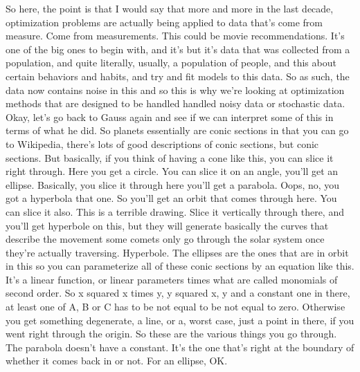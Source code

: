 \documentclass[11pt,a4paper]{article}
\begin{document}
So here, the point is that I would say that more and more in the last decade, optimization problems are actually being applied to data that's come from measure. Come from measurements. This could be movie recommendations. It's one of the big ones to begin with, and it's but it's data that was collected from a population, and quite literally, usually, a population of people, and this about certain behaviors and habits, and try and fit models to this data. So as such, the data now contains noise in this and so this is why we're looking at optimization methods that are designed to be handled handled noisy data or stochastic data. Okay, let's go back to Gauss again and see if we can interpret some of this in terms of what he did. So planets essentially are conic sections in that you can go to Wikipedia, there's lots of good descriptions of conic sections, but conic sections. But basically, if you think of having a cone like this, you can slice it right through. Here you get a circle. You can slice it on an angle, you'll get an ellipse. Basically, you slice it through here you'll get a parabola. Oops, no, you got a hyperbola that one. So you'll get an orbit that comes through here. You can slice it also. This is a terrible drawing. Slice it vertically through there, and you'll get hyperbole on this, but they will generate basically the curves that describe the movement some comets only go through the solar system once they're actually traversing. Hyperbole. The ellipses are the ones that are in orbit in this so you can parameterize all of these conic sections by an equation like this. It's a linear function, or linear parameters times what are called monomials of second order. So x squared x times y, y squared x, y and a constant one in there, at least one of A, B or C has to be not equal to be not equal to zero. Otherwise you get something degenerate, a line, or a, worst case, just a point in there, if you went right through the origin. So these are the various things you go through. The parabola doesn't have a constant. It's the one that's right at the boundary of whether it comes back in or not. For an ellipse, OK.
\end{document}
